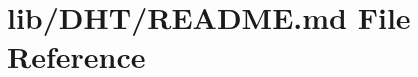 \hypertarget{lib_2_d_h_t_2_r_e_a_d_m_e_8md}{}\section{lib/\+D\+H\+T/\+R\+E\+A\+D\+ME.md File Reference}
\label{lib_2_d_h_t_2_r_e_a_d_m_e_8md}
